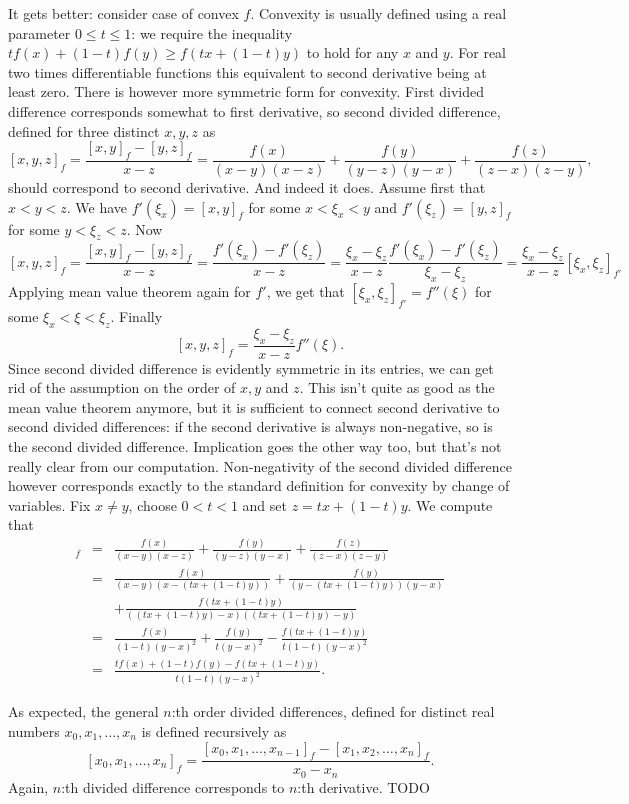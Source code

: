 It gets better: consider case of convex $f$. Convexity is usually defined using a real parameter $0 \leq t \leq 1$: we require the inequality $t f(x) + (1 - t) f(y) \geq f(t x + (1 - t)y)$ to hold for any $x$ and $y$. For real two times differentiable functions this equivalent to second derivative being at least zero. There is however more symmetric form for convexity. First divided difference corresponds somewhat to first derivative, so second divided difference, defined for three distinct $x, y, z$ as
\[
	[x, y, z]_{f} = \frac{[x, y]_{f} - [y, z]_{f}}{x - z} = \frac{f(x)}{(x - y)(x - z)} + \frac{f(y)}{(y - z)(y - x)} + \frac{f(z)}{(z - x)(z - y)},
\]
should correspond to second derivative. And indeed it does. Assume first that $x < y < z$. We have $f'(\xi_{x}) = [x, y]_{f}$ for some $x < \xi_{x} < y$ and $f'(\xi_{z}) = [y, z]_{f}$ for some $y < \xi_{z} < z$. Now
\[
	[x, y, z]_{f} = \frac{[x, y]_{f} - [y, z]_{f}}{x - z} = \frac{f'(\xi_{x}) - f'(\xi_{z})}{x - z} = \frac{\xi_{x} - \xi_{z}}{x - z} \frac{f'(\xi_{x}) - f'(\xi_{z})}{\xi_{x} - \xi_{z}} = \frac{\xi_{x} - \xi_{z}}{x - z} [\xi_{x}, \xi_{z}]_{f'}
\]
Applying mean value theorem again for $f'$, we get that $[\xi_{x}, \xi_{z}]_{f'} = f''(\xi)$ for some $\xi_{x} < \xi < \xi_{z}$. Finally
\[
	[x, y, z]_{f} = \frac{\xi_{x} - \xi_{z}}{x - z} f''(\xi).
\]
Since second divided difference is evidently symmetric in its entries, we can get rid of the assumption on the order of $x, y$ and $z$. This isn't quite as good as the mean value theorem anymore, but it is sufficient to connect second derivative to second divided differences: if the second derivative is always non-negative, so is the second divided difference. Implication goes the other way too, but that's not really clear from our computation. Non-negativity of the second divided difference however corresponds exactly to the standard definition for convexity by change of variables. Fix $x \neq y$, choose $0 < t < 1$ and set $z = t x + (1 - t) y$. We compute that
\begin{eqnarray*}
	[x, y, z]_{f} &=& \frac{f(x)}{(x - y)(x - z)} + \frac{f(y)}{(y - z)(y - x)} + \frac{f(z)}{(z - x)(z - y)} \\
	&=& \frac{f(x)}{(x - y)(x - (t x + (1 - t) y))} + \frac{f(y)}{(y - (t x + (1 - t) y))(y - x)} \\
	& &+ \frac{f(t x + (1 - t) y)}{((t x + (1 - t) y) - x)((t x + (1 - t) y) - y)} \\
	&=& \frac{f(x)}{(1 - t)(y - x)^2} + \frac{f(y)}{t (y - x)^2} - \frac{f(t x + (1 - t) y)}{t (1 - t) (y - x)^2} \\
	&=& \frac{t f(x) + (1 - t) f(y) - f(t x + (1 - t) y)}{t (1 - t) (y - x)^2}.
\end{eqnarray*}

As expected, the general $n$:th order divided differences, defined for distinct real numbers $x_{0}, x_{1}, \ldots, x_{n}$ is defined recursively as
\[
[x_{0}, x_{1}, \ldots, x_{n}]_{f} = \frac{[x_{0}, x_{1}, \ldots, x_{n - 1}]_{f} - [x_{1}, x_{2}, \ldots, x_{n}]_{f}}{x_{0} - x_{n}}.
\]
Again, $n$:th divided difference corresponds to $n$:th derivative. TODO
